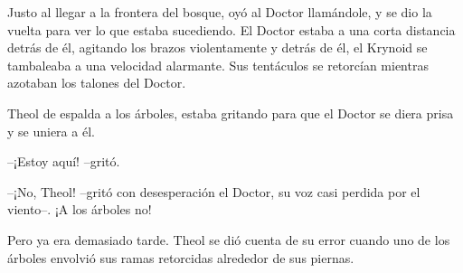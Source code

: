 Justo al llegar a la frontera del bosque, oyó al Doctor llamándole, y se dio la vuelta para ver lo que estaba sucediendo. El Doctor estaba a una corta distancia detrás de él, agitando los brazos violentamente y detrás de él, el Krynoid se tambaleaba a una velocidad alarmante. Sus tentáculos se retorcían mientras azotaban los talones del Doctor.



Theol de espalda a los árboles, estaba gritando para que el Doctor se diera prisa y se uniera a él.

 --¡Estoy aquí! --gritó.



--¡No, Theol! --gritó con desesperación el Doctor, su voz casi perdida por el viento--. ¡A los árboles no!



Pero ya era demasiado tarde. Theol se dió cuenta de su error cuando uno de los árboles envolvió sus ramas retorcidas alrededor de sus piernas.
